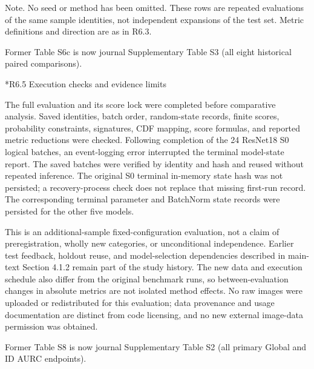 \documentclass[11pt,a4paper]{article}
\makeatletter
\renewcommand\subsection{\@startsection{subsection}{2}{\z@}{-1.8ex plus -.5ex minus -.2ex}{.7ex plus .2ex}{\normalfont\normalsize\bfseries\raggedright}}
\makeatother
\begin{document}
\begingroup\footnotesize
Note. No seed or method has been omitted. These rows are repeated evaluations of the same sample identities, not independent expansions of the test set. Metric definitions and direction are as in R6.3.\par
\endgroup

\noindent Former Table S6c is now journal Supplementary Table S3 (all eight historical paired comparisons).

\subsection*{R6.5 Execution checks and evidence limits}\label{s6.5-execution-checks-and-evidence-limits}

The full evaluation and its score lock were completed before comparative analysis. Saved identities, batch order, random-state records, finite scores, probability constraints, signatures, CDF mapping, score formulas, and reported metric reductions were checked. Following completion of the 24 ResNet18 S0 logical batches, an event-logging error interrupted the terminal model-state report. The saved batches were verified by identity and hash and reused without repeated inference. The original S0 terminal in-memory state hash was not persisted; a recovery-process check does not replace that missing first-run record. The corresponding terminal parameter and BatchNorm state records were persisted for the other five models.

This is an additional-sample fixed-configuration evaluation, not a claim of preregistration, wholly new categories, or unconditional independence. Earlier test feedback, holdout reuse, and model-selection dependencies described in main-text Section 4.1.2 remain part of the study history. The new data and execution schedule also differ from the original benchmark runs, so between-evaluation changes in absolute metrics are not isolated method effects. No raw images were uploaded or redistributed for this evaluation; data provenance and usage documentation are distinct from code licensing, and no new external image-data permission was obtained.

\clearpage

\noindent Former Table S8 is now journal Supplementary Table S2 (all primary Global and ID AURC endpoints).

\end{document}
